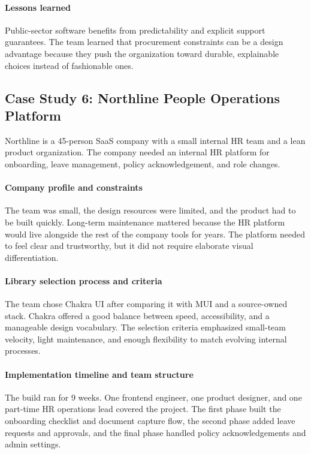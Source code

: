 \paragraph{Lessons learned}
Public-sector software benefits from predictability and explicit support guarantees. The team learned that procurement constraints can be a design advantage because they push the organization toward durable, explainable choices instead of fashionable ones.

\subsection{Case Study 6: Northline People Operations Platform}
Northline is a 45-person SaaS company with a small internal HR team and a lean product organization. The company needed an internal HR platform for onboarding, leave management, policy acknowledgement, and role changes.

\paragraph{Company profile and constraints}
The team was small, the design resources were limited, and the product had to be built quickly. Long-term maintenance mattered because the HR platform would live alongside the rest of the company tools for years. The platform needed to feel clear and trustworthy, but it did not require elaborate visual differentiation.

\paragraph{Library selection process and criteria}
The team chose Chakra UI after comparing it with MUI and a source-owned stack. Chakra offered a good balance between speed, accessibility, and a manageable design vocabulary. The selection criteria emphasized small-team velocity, light maintenance, and enough flexibility to match evolving internal processes.

\paragraph{Implementation timeline and team structure}
The build ran for 9 weeks. One frontend engineer, one product designer, and one part-time HR operations lead covered the project. The first phase built the onboarding checklist and document capture flow, the second phase added leave requests and approvals, and the final phase handled policy acknowledgements and admin settings.

